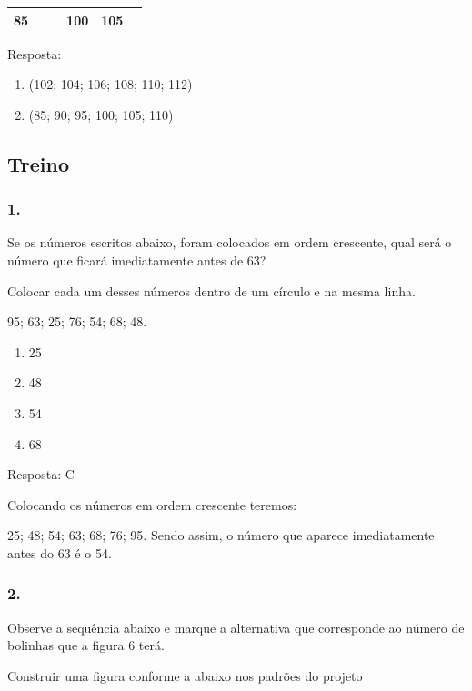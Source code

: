 \begin{longtable}[]{@{}llllll@{}}
\toprule
85 & & & 100 & 105 &\tabularnewline
\bottomrule
\end{longtable}

Resposta:

\begin{enumerate}
\def\labelenumi{\alph{enumi})}
\item
  (102; 104; 106; 108; 110; 112)
\item
  (85; 90; 95; 100; 105; 110)
\end{enumerate}

\subsection{Treino}\label{treino-2}

\subsubsection{1.}\label{section-48}

Se os números escritos abaixo, foram colocados em ordem crescente, qual
será o número que ficará imediatamente antes de 63?

Colocar cada um desses números dentro de um círculo e na mesma linha.

95; 63; 25; 76; 54; 68; 48.

\begin{enumerate}
\def\labelenumi{\alph{enumi})}
\item
  25
\item
  48
\item
  54
\item
  68
\end{enumerate}

Resposta: C

Colocando os números em ordem crescente teremos:

25; 48; 54; 63; 68; 76; 95. Sendo assim, o número que aparece
imediatamente antes do 63 é o 54.

\subsubsection{2.}\label{section-49}

Observe a sequência abaixo e marque a alternativa que corresponde ao
número de bolinhas que a figura 6 terá.

Construir uma figura conforme a abaixo nos padrões do projeto

